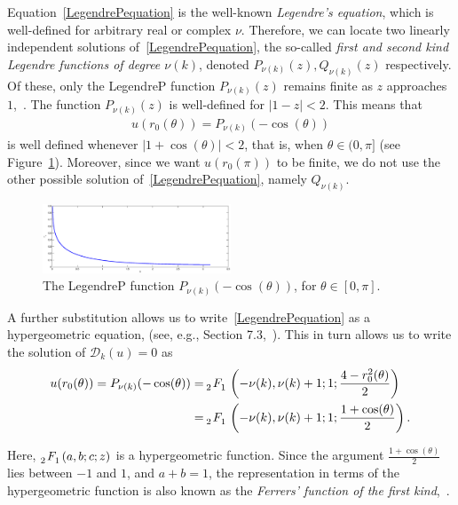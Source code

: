\documentclass[final]{siamltex}
\newcommand{\todo}[1]{ \fbox{{\bf TODO:} \color{red} #1}}
\begin{document}
Equation~\eqref{LegendrePequation} is the well-known {\it Legendre's
equation}, which is well-defined for arbitrary real or complex $\nu$.
Therefore, we can locate two linearly independent solutions
of~\eqref{LegendrePequation}, the so-called {\it first and second kind
Legendre functions of degree $\nu(k)$}, denoted $ P_{\nu(k)}(z),
Q_{\nu(k)}(z)$ respectively. Of these, only the  LegendreP function
$P_{\nu(k)}(z)$ remains finite as $z$ approaches $1$,~\cite{lebedev}.
The function $P_{\nu(k)}(z)$ is well-defined for $|1-z|<2$.  This means
that
\begin{align*}
  u(r_0(\theta)) =  P_{\nu(k)}(-\cos(\theta))
\end{align*}
is well defined whenever $|1+\cos(\theta)|<2$, that is, when $\theta
\in(0,\pi]$ (see Figure~\ref{f:legendreP}).  Moreover, since we want
$u(r_0(\pi))$ to be finite, we do not use the other possible solution
of~\eqref{LegendrePequation}, namely $Q_{\nu(k)}$.
\begin{figure}
  \centering
  \includegraphics[width=0.5\textwidth]{Pnu}
  \caption{\label{f:legendreP} The LegendreP function
  $P_{\nu(k)}(-\cos(\theta))$, for $\theta \in [0,\pi]$.}
  \todo{bq: convert to tikz}
\end{figure}
A further substitution allows us to write~\eqref{LegendrePequation} as a
hypergeometric equation, (see, e.g., Section 7.3,~\cite{lebedev}). This
in turn allows us to write the solution of $\mathcal{D}_k(u)=0$ as 
\begin{align*} 
  u(r_0(\theta)) = P_{\nu(k)}(-\cos(\theta)) &= 
    \tensor[_2]{F}{_1}\left(-\nu(k), \nu(k)+  1; 1; 
      \frac{4-r_0^2(\theta)}{2}\right) \\
    &=\tensor[_2]{F}{_1}\left(-\nu(k), \nu(k)+  1; 1;
    \frac{1+\cos(\theta)}{2}\right).
\end{align*} 

Here, $\tensor[_2]{F}{_1}(a,b;c;z)$ is a hypergeometric function. Since
the argument $\frac{1+\cos(\theta)}{2}$ lies between $-1$ and $1$, and
$a+b = 1$, the representation in terms of the hypergeometric function is
also known as the {\it Ferrers' function of the first
kind},~\cite{fatAbramowitz}. 
\end{document}
